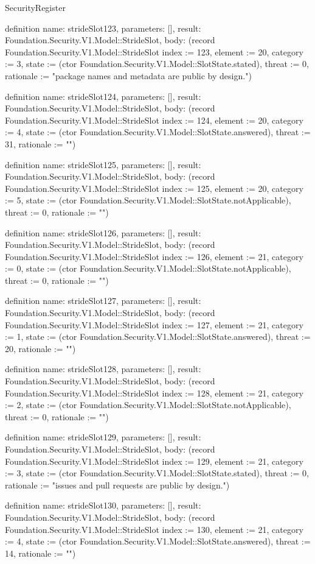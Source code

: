\begin{lexlean}{SecurityRegister}
\begin{semanticmodule}
definition{
  name: strideSlot123,
  parameters: [],
  result: Foundation.Security.V1.Model::StrideSlot,
  body: (record Foundation.Security.V1.Model::StrideSlot {index := 123, element := 20, category := 3, state := (ctor Foundation.Security.V1.Model::SlotState.stated), threat := 0, rationale := "package names and metadata are public by design."})
}

definition{
  name: strideSlot124,
  parameters: [],
  result: Foundation.Security.V1.Model::StrideSlot,
  body: (record Foundation.Security.V1.Model::StrideSlot {index := 124, element := 20, category := 4, state := (ctor Foundation.Security.V1.Model::SlotState.answered), threat := 31, rationale := ""})
}

definition{
  name: strideSlot125,
  parameters: [],
  result: Foundation.Security.V1.Model::StrideSlot,
  body: (record Foundation.Security.V1.Model::StrideSlot {index := 125, element := 20, category := 5, state := (ctor Foundation.Security.V1.Model::SlotState.notApplicable), threat := 0, rationale := ""})
}

definition{
  name: strideSlot126,
  parameters: [],
  result: Foundation.Security.V1.Model::StrideSlot,
  body: (record Foundation.Security.V1.Model::StrideSlot {index := 126, element := 21, category := 0, state := (ctor Foundation.Security.V1.Model::SlotState.notApplicable), threat := 0, rationale := ""})
}

definition{
  name: strideSlot127,
  parameters: [],
  result: Foundation.Security.V1.Model::StrideSlot,
  body: (record Foundation.Security.V1.Model::StrideSlot {index := 127, element := 21, category := 1, state := (ctor Foundation.Security.V1.Model::SlotState.answered), threat := 20, rationale := ""})
}

definition{
  name: strideSlot128,
  parameters: [],
  result: Foundation.Security.V1.Model::StrideSlot,
  body: (record Foundation.Security.V1.Model::StrideSlot {index := 128, element := 21, category := 2, state := (ctor Foundation.Security.V1.Model::SlotState.notApplicable), threat := 0, rationale := ""})
}

definition{
  name: strideSlot129,
  parameters: [],
  result: Foundation.Security.V1.Model::StrideSlot,
  body: (record Foundation.Security.V1.Model::StrideSlot {index := 129, element := 21, category := 3, state := (ctor Foundation.Security.V1.Model::SlotState.stated), threat := 0, rationale := "issues and pull requests are public by design."})
}

definition{
  name: strideSlot130,
  parameters: [],
  result: Foundation.Security.V1.Model::StrideSlot,
  body: (record Foundation.Security.V1.Model::StrideSlot {index := 130, element := 21, category := 4, state := (ctor Foundation.Security.V1.Model::SlotState.answered), threat := 14, rationale := ""})
}


\end{semanticmodule}
\end{lexlean}
